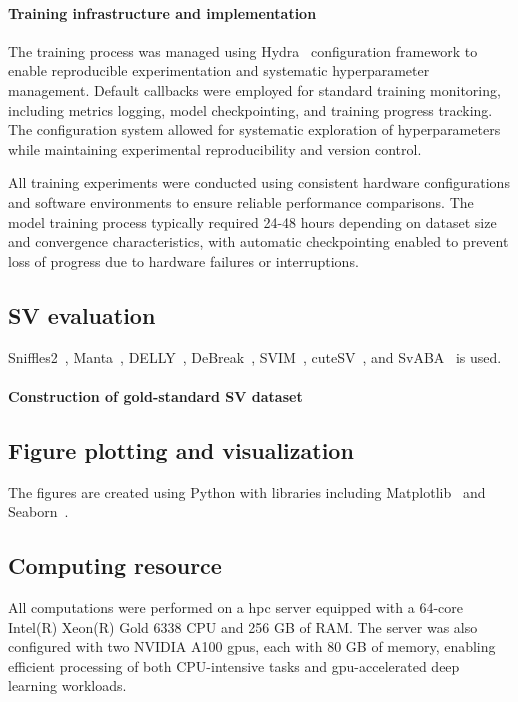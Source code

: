 \documentclass[pdflatex,sn-nature]{sn-jnl}%
\theoremstyle{thmstyleone}%
\theoremstyle{thmstyletwo}%
\theoremstyle{thmstylethree}%
\begin{document}
\paragraph{Training infrastructure and implementation}
The training process was managed using Hydra~\cite{Yadan2019Hydra} configuration framework to enable reproducible experimentation and systematic hyperparameter management.
Default callbacks were employed for standard training monitoring, including metrics logging, model checkpointing, and training progress tracking.
The configuration system allowed for systematic exploration of hyperparameters while maintaining experimental reproducibility and version control.

All training experiments were conducted using consistent hardware configurations and software environments to ensure reliable performance comparisons.
The model training process typically required 24-48 hours depending on dataset size and convergence characteristics, with automatic checkpointing enabled to prevent loss of progress due to hardware failures or interruptions.

\subsection*{SV evaluation}

Sniffles2~\cite{Sedlazeck2018, Smolka2024}, Manta~\cite{chen2016manta}, DELLY~\cite{rausch2012delly}, DeBreak~\cite{chen2023deciphering}, SVIM~\cite{heller2019svim}, cuteSV~\cite{jiang2020longreadbased}, and SvABA~\cite{wala2018svaba} is used.

\paragraph*{Construction of gold-standard SV dataset}

\subsection*{Figure plotting and visualization}

The figures are created using Python with libraries including Matplotlib~\cite{Hunter2007} and Seaborn~\cite{Waskom2021}.

\subsection*{Computing resource}

All computations were performed on a \gls{hpc} server equipped with a 64-core Intel(R) Xeon(R) Gold 6338 CPU and 256 GB of RAM.
The server was also configured with two NVIDIA A100 \glspl{gpu}, each with 80 GB of memory, enabling efficient processing of both CPU-intensive tasks and \gls{gpu}-accelerated deep learning workloads.
\end{document}
